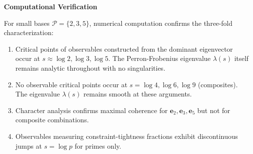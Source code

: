 \noindent \textbf{Computational Verification}
\label{subsec:numerical-verification}

For small bases $\mathcal{P} = \{2, 3, 5\}$, numerical computation confirms the three-fold characterization:
\begin{enumerate}
\item Critical points of observables constructed from the dominant eigenvector occur at $s \approx \log 2, \log 3, \log 5$. The Perron-Frobenius eigenvalue $\lambda(s)$ itself remains analytic throughout with no singularities.
\item No observable critical points occur at $s = \log 4, \log 6, \log 9$ (composites). The eigenvalue $\lambda(s)$ remains smooth at these arguments.
\item Character analysis confirms maximal coherence for $\mathbf{e}_2, \mathbf{e}_3, \mathbf{e}_5$ but not for composite combinations.
\item Observables measuring constraint-tightness fractions exhibit discontinuous jumps at $s = \log p$ for primes only.
\end{enumerate}

